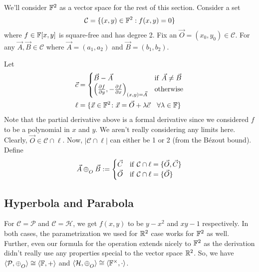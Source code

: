 \noindent
We'll consider $\mathbb{F}^2$ as a vector space for the rest of this section. 
Consider a set
\[ \mathcal{C} = \{(x,y)\in\mathbb{F}^2: f(x,y)=0\} \]
where $f\in\mathbb{F}[x,y]$ is square-free and has degree 2. Fix an
$\vec O=(x_0,y_0)\in\mathcal{C}$.  For any $\vec{A},\vec{B}\in\mathcal{C}$ where
$\vec{A}=(a_1,a_2)$ and $\vec{B}=(b_1,b_2)$.
\vspace{1ex}

\noindent
Let 
\begin{align*}
    \vec{c} &=
        \begin{cases}
            \vec{B}-\vec{A} & \mathrm{if}\ \vec{A}\neq\vec{B} \\
            \left(
                \frac{\partial f}{\partial y}, -\frac{\partial f}{\partial x}
            \right)_{(x,y)=\vec{A}} & \mathrm{otherwise}
        \end{cases} \\
    \ell &=
        \{\vec{x}\in\mathbb{F}^2\colon
        \vec{x} = \vec{O} + \lambda\vec{c}\quad\forall\lambda\in\mathbb{F}\}
\end{align*}
Note that the partial derivative above is a formal derivative since we considered
$f$ to be a polynomial in $x$ and $y$. We aren't really considering any limits
here. Clearly, $\vec{O}\in\mathcal{C}\cap\ell$. Now, $|\mathcal{C}\cap\ell|$ can
either be 1 or 2 (from the B\'ezout bound). Define
\[
    \vec{A} \conop \vec{B} :=
        \begin{cases}
            \vec{C} & \mathrm{if}\ \mathcal{C}\cap\ell = \{\vec{O},\vec{C}\} \\
            \vec{O} & \mathrm{if}\ \mathcal{C}\cap\ell = \{\vec{O}\} \\
        \end{cases}
\]

\subsection*{Hyperbola and Parabola}

For $\mathcal{C}=\mathcal{P}$ and $\mathcal{C}=\mathcal{H}$, we get $f(x,y)$ to be
$y - x^2$ and $xy - 1$ respectively. In both cases, the parametrization we used
for $\mathbb{R}^2$ case works for $\mathbb{F}^2$ as well. Further, even our
formula for the operation extends nicely to $\mathbb{F}^2$ as the derivation
didn't really use any properties special to the vector space $\mathbb{R}^2$. So,
we have $\langle\mathcal{P},\conop\rangle \cong \langle\F,+\rangle$ and
$\langle\mathcal{H},\conop\rangle \cong \langle\F^\times,\cdot\rangle$.

